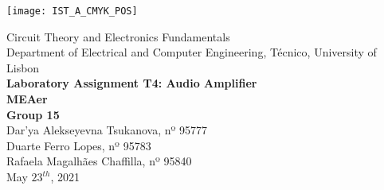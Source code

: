 
\thispagestyle {empty}

\texttt{[image: IST\_A\_CMYK\_POS]}

\begin{center}
%
\vspace{1.0cm}

\vspace{1cm}
{\FontLb Circuit Theory and Electronics Fundamentals} \\ %
\vspace{1cm}
{\FontSn Department of Electrical and Computer Engineering, Técnico, University of Lisbon} \\ %
\vspace{1cm}
{\FontSn \textbf{Laboratory Assignment T4: Audio Amplifier}} \\
\vspace{1cm}
{\FontSn \textbf{MEAer}} \\ %
\vspace{1cm}
{\FontSn \textbf{Group 15}} \\
\vspace{.5cm}
{\FontSn Dar'ya Alekseyevna Tsukanova, nº 95777} \\
{\FontSn Duarte Ferro Lopes, nº 95783} \\
{\FontSn Rafaela Magalhães Chaffilla, nº 95840} \\
\vspace{1cm}
{\FontSn May $23^{th}$, 2021} \\ %
%
\end{center}


